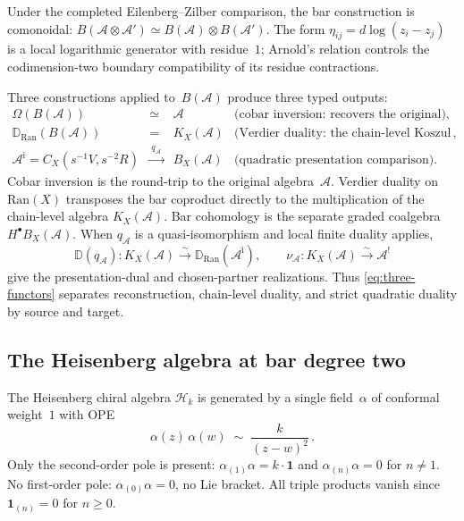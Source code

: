 \documentclass[11pt,reqno]{amsart}
\theoremstyle{definition}
\theoremstyle{remark}
\newcommand{\cA}{\mathcal{A}}
\newcommand{\cH}{\mathcal{H}}
\newcommand{\Ran}{\mathrm{Ran}}
\numberwithin{equation}{section}
\begin{document}
Under the completed Eilenberg--Zilber comparison, the bar construction
is comonoidal:
$B(\cA \otimes \cA') \simeq B(\cA) \otimes B(\cA')$.
The form $\eta_{ij}=d\log(z_i-z_j)$ is a local logarithmic generator
with residue~$1$; Arnold's relation controls the codimension-two
boundary compatibility of its residue contractions.

Three constructions applied to~$B(\cA)$ produce three typed outputs:
\begin{equation}\label{eq:three-functors}
\begin{array}{lcll}
\Omega(B(\cA)) &\simeq& \cA
 & \text{(cobar inversion: recovers the original)},\\[3pt]
\mathbb{D}_{\Ran}(B(\cA))
 &=& K_X(\cA)
 & \text{(Verdier duality: the chain-level Koszul algebra)},
 \\[3pt]
\cA^{\mathrm i}=C_X(s^{-1}V,s^{-2}R)
 &\xrightarrow{\ q_\cA\ }&B_X(\cA)
 & \text{(quadratic presentation comparison)}.
\end{array}
\end{equation}
Cobar inversion is the round-trip to the original algebra~$\cA$.
Verdier duality on $\Ran(X)$ transposes the bar coproduct directly to
the multiplication of the chain-level algebra $K_X(\cA)$.  Bar
cohomology is the separate graded coalgebra $H^\bullet B_X(\cA)$.
When $q_\cA$ is a quasi-isomorphism and local finite duality applies,
\[
\mathbb D(q_\cA)\colon K_X(\cA)
\xrightarrow{\sim}\mathbb D_{\Ran}(\cA^{\mathrm i}),
\qquad
\nu_\cA\colon K_X(\cA)\xrightarrow{\sim}\cA^!
\]
give the presentation-dual and chosen-partner realizations.  Thus
\eqref{eq:three-functors} separates reconstruction, chain-level
duality, and strict quadratic duality by source and target.


\subsection{The Heisenberg algebra at bar degree two}
\label{ssec:heisenberg}

The Heisenberg chiral algebra $\cH_k$ is generated by a
single field~$\alpha$ of conformal weight~$1$ with OPE
\begin{equation}\label{eq:heis-ope}
\alpha(z)\,\alpha(w)
\;\sim\;
\frac{k}{(z-w)^2}\,.
\end{equation}
Only the second-order pole is present:
$\alpha_{(1)}\alpha = k \cdot \mathbf{1}$ and
$\alpha_{(n)}\alpha = 0$ for $n \neq 1$. No first-order
pole: $\alpha_{(0)}\alpha = 0$, no Lie bracket.
All triple products vanish since
$\mathbf{1}_{(n)} = 0$ for $n \ge 0$.
\end{document}
